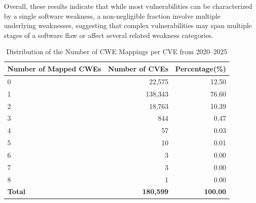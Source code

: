 \documentclass[conference,compsoc]{IEEEtran}
\begin{document}
Overall, these results indicate that while most vulnerabilities can be characterized by a single software weakness, a non-negligible fraction involve multiple underlying weaknesses, suggesting that complex vulnerabilities may span multiple stages of a software flaw or affect several related weakness categories.




\begin{table}[t]
\centering
\caption{Distribution of the Number of CWE Mappings per CVE from 2020--2025}
\label{tab:cwe_mapping_distribution_2020_2025}
\begin{tabular}{lrr}
\toprule
\textbf{Number of Mapped CWEs } & \textbf{  Number of CVEs} & \textbf{  Percentage(\%)} \\
\midrule
0 & 22,575  & 12.50 \\
1 & 138,343 & 76.60 \\
2 & 18,763  & 10.39 \\
3 & 844      & 0.47 \\
4 & 57       & 0.03 \\
5 & 10       & 0.01 \\
6 & 3        & 0.00 \\
7 & 3        & 0.00 \\
8 & 1        & 0.00 \\
\midrule
\textbf{Total} & \textbf{180,599} & \textbf{100.00} \\
\bottomrule
\end{tabular}
\end{table}
\end{document}
